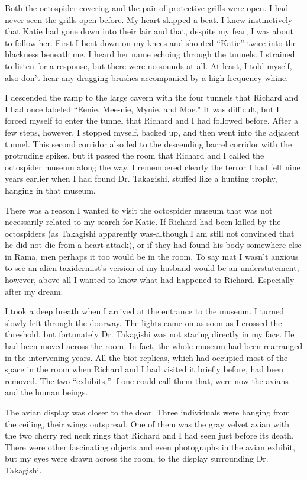 \documentclass[]{article}
\begin{document}
Both the octospider covering and the pair of protective grills were open.  I had never seen the grills open before.  My heart skipped a beat.  I knew instinctively that Katie had gone down into their lair and that, despite my fear, I was about to follow her.  First I bent down on my knees and shouted “Katie” twice into the blackness beneath me.  I heard her name echoing through the tunnels.  I strained to listen for a response, but there were no sounds at all.  At least, I told myself, also don’t hear any dragging brushes accompanied by a high-frequency whine.

I descended the ramp to the large cavern with the four tunnels that Richard and I had once labeled “Eenie, Mee-nie, Mynie, and Moe."  It was difficult, but I forced myself to enter the tunnel that Richard and I had followed before.  After a few steps, however, I stopped myself, backed up, and then went into the adjacent tunnel.  This second corridor also led to the descending barrel corridor with the protruding spikes, but it passed the room that Richard and I called the octospider museum along the way.  I remembered clearly the terror I had felt nine years earlier when I had found Dr.  Takagishi, stuffed like a hunting trophy, hanging in that museum.

There was a reason I wanted to visit the octospider museum that was not necessarily related to my search for Katie.  If Richard had been killed by the octospiders (as Takagishi apparently was-although I am still not convinced that he did not die from a heart attack), or if they had found his body somewhere else in Rama, men perhaps it too would be in the room.  To say mat I wasn’t anxious to see an alien taxidermist’s version of my husband would be an understatement; however, above all I wanted to know what had happened to Richard.  Especially after my dream.

I took a deep breath when I arrived at the entrance to the museum.  I turned slowly left through the doorway.  The lights came on as soon as I crossed the threshold, but fortunately Dr.  Takagishi was not staring directly in my face.  He had been moved across the room.  In fact, the whole museum had been rearranged in the intervening years.  All the biot replicas, which had occupied most of the space in the room when Richard and I had visited it briefly before, had been removed.  The two “exhibits,” if one could call them that, were now the avians and the human beings.

The avian display was closer to the door.  Three individuals were hanging from the ceiling, their wings outspread.  One of them was the gray velvet avian with the two cherry red neck rings that Richard and I had seen just before its death.  There were other fascinating objects and even photographs in the avian exhibit, but my eyes were drawn across the room, to the display surrounding Dr.  Takagishi.
\end{document}
